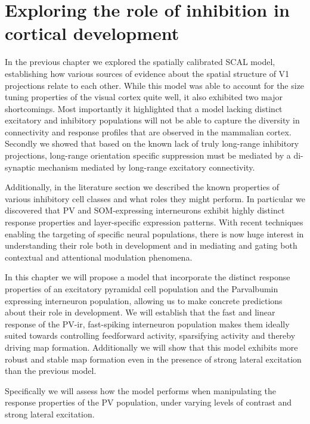 \chapter{Exploring the role of inhibition in cortical development}

In the previous chapter we explored the spatially calibrated SCAL
model, establishing how various sources of evidence about the spatial
structure of V1 projections relate to each other. While this model was
able to account for the size tuning properties of the visual cortex
quite well, it also exhibited two major shortcomings. Most importantly
it highlighted that a model lacking distinct excitatory and inhibitory
populations will not be able to capture the diversity in connectivity
and response profiles that are observed in the mammalian
cortex. Secondly we showed that based on the known lack of truly
long-range inhibitory projections, long-range orientation specific
suppression must be mediated by a di-synaptic mechanism mediated by
long-range excitatory connectivity.

Additionally, in the literature section we described the known
properties of various inhibitory cell classes and what roles they
might perform. In particular we discovered that PV and SOM-expressing
interneurons exhibit highly distinct response properties and
layer-specific expression patterns. With recent techniques enabling
the targeting of specific neural populations, there is now huge
interest in understanding their role both in development and in
mediating and gating both contextual and attentional modulation
phenomena.

In this chapter we will propose a model that incorporate the distinct
response properties of an excitatory pyramidal cell population and the
Parvalbumin expressing interneuron population, allowing us to make
concrete predictions about their role in development. We will
establish that the fast and linear response of the PV-ir, fast-spiking
interneuron population makes them ideally suited towards controlling
feedforward activity, sparsifying activity and thereby driving map
formation. Additionally we will show that this model exhibits more
robust and stable map formation even in the presence of strong lateral
excitation than the previous model.

Specifically we will assess how the model performs when manipulating
the response properties of the PV population, under varying levels of
contrast and strong lateral excitation.

